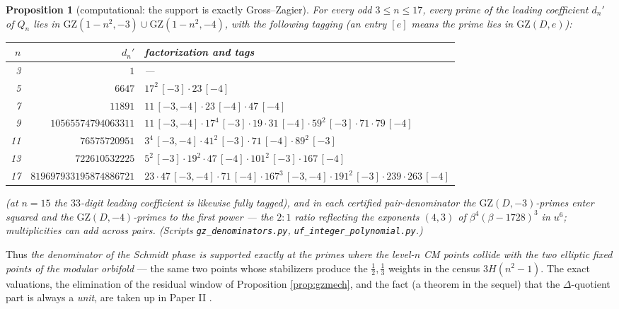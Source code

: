 \documentclass[11pt]{amsart}
\numberwithin{equation}{section}
\theoremstyle{plain}
\newtheorem{proposition}[theorem]{Proposition}
\theoremstyle{definition}
\theoremstyle{remark}
\newcommand{\GZ}{\mathrm{GZ}}
\begin{document}
\begin{proposition}[computational: the support is exactly
Gross--Zagier]\label{prop:gzsupport}
For every odd $3 \le n \le 17$, every prime of the leading coefficient
$d_n'$ of $Q_n$ lies in $\GZ(1 - n^2, -3) \cup \GZ(1 - n^2, -4)$, with
the following tagging (an entry $[e]$ means the prime lies in
$\GZ(D, e)$):
\begin{center}
\footnotesize
\begin{tabular}{@{}rrp{6.3cm}@{}}
\toprule
$n$ & $d_n'$ & factorization and tags\\
\midrule
3 & $1$ & ---\\
5 & $6647$ & $17^2\,[-3]\cdot 23\,[-4]$\\
7 & $11891$ & $11\,[-3,-4]\cdot 23\,[-4]\cdot 47\,[-4]$\\
9 & $10565574794063311$ & $11\,[-3,-4]\cdot 17^4\,[-3]\cdot 19\cdot
31\,[-4]\cdot 59^2\,[-3]\cdot 71\cdot 79\,[-4]$\\
11 & $76575720951$ & $3^4\,[-3,-4]\cdot 41^2\,[-3]\cdot 71\,[-4]\cdot
89^2\,[-3]$\\
13 & $722610532225$ & $5^2\,[-3]\cdot 19^2\cdot 47\,[-4]\cdot
101^2\,[-3]\cdot 167\,[-4]$\\
17 & $819697933195874886721$ & $23\cdot 47\,[-3,-4]\cdot 71\,[-4]\cdot
167^3\,[-3,-4]\cdot 191^2\,[-3]\cdot 239\cdot 263\,[-4]$\\
\bottomrule
\end{tabular}
\end{center}
(at $n = 15$ the $33$-digit leading coefficient is likewise fully
tagged), and in each certified pair-denominator the
$\GZ(D,-3)$-primes enter squared and the $\GZ(D,-4)$-primes to the
first power --- the $2 : 1$ ratio reflecting the exponents $(4, 3)$ of
$\beta^4(\beta - 1728)^3$ in $u^6$; multiplicities can add across
pairs.  \emph{(Scripts \texttt{gz\_denominators.py},
\texttt{uf\_integer\_polynomial.py}.)}
\end{proposition}

Thus \emph{the denominator of the Schmidt phase is supported exactly at
the primes where the level-$n$ CM points collide with the two elliptic
fixed points of the modular orbifold} --- the same two points whose
stabilizers produce the $\tfrac12, \tfrac13$ weights in the census
$3H(n^2 - 1)$.  The exact valuations, the elimination of the residual
window of Proposition \ref{prop:gzmech}, and the fact (a theorem in
the sequel) that the $\Delta$-quotient part is always a \emph{unit},
are taken up in Paper II \cite{PaperII}.
\end{document}
